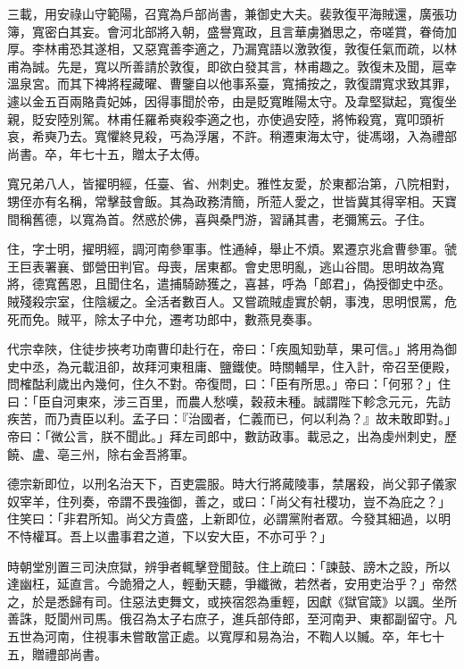 \begin{pinyinscope}
 三載，用安祿山守範陽，召寬為戶部尚書，兼御史大夫。裴敦復平海賊還，廣張功簿，寬密白其妄。會河北部將入朝，盛譽寬政，且言華虜猶思之，帝嗟賞，眷倚加厚。李林甫恐其遂相，又惡寬善李適之，乃漏寬語以激敦復，敦復任氣而疏，以林甫為誠。先是，寬以所善請於敦復，即欲白發其言，林甫趣之。敦復未及聞，扈幸溫泉宮。而其下裨將程藏曜、曹鑒自以他事系臺，寬捕按之，敦復謂寬求致其罪，遽以金五百兩賂貴妃姊，因得事聞於帝，由是貶寬睢陽太守。及韋堅獄起，寬復坐親，貶安陸別駕。林甫任羅希奭殺李適之也，亦使過安陸，將怖殺寬，寬叩頭祈哀，希奭乃去。寬懼終見殺，丐為浮屠，不許。稍遷東海太守，徙馮翊，入為禮部尚書。卒，年七十五，贈太子太傅。



 寬兄弟八人，皆擢明經，任臺、省、州刺史。雅性友愛，於東都治第，八院相對，甥侄亦有名稱，常擊鼓會飯。其為政務清簡，所蒞人愛之，世皆冀其得宰相。天寶間稱舊德，以寬為首。然惑於佛，喜與桑門游，習誦其書，老彌篤云。子住。



 住，字士明，擢明經，調河南參軍事。性通綽，舉止不煩。累遷京兆倉曹參軍。虢王巨表署襄、鄧營田判官。母喪，居東都。會史思明亂，逃山谷間。思明故為寬將，德寬舊恩，且聞住名，遣捕騎跡獲之，喜甚，呼為「郎君」，偽授御史中丞。賊殘殺宗室，住陰緩之。全活者數百人。又嘗疏賊虛實於朝，事洩，思明恨罵，危死而免。賊平，除太子中允，遷考功郎中，數燕見奏事。



 代宗幸陜，住徒步挾考功南曹印赴行在，帝曰：「疾風知勁草，果可信。」將用為御史中丞，為元載沮卻，故拜河東租庸、鹽鐵使。時關輔旱，住入計，帝召至便殿，問榷酤利歲出內幾何，住久不對。帝復問，曰：「臣有所思。」帝曰：「何邪？」住曰：「臣自河東來，涉三百里，而農人愁嘆，穀菽未種。誠謂陛下軫念元元，先訪疾苦，而乃責臣以利。孟子曰：『治國者，仁義而已，何以利為？』故未敢即對。」帝曰：「微公言，朕不聞此。」拜左司郎中，數訪政事。載忌之，出為虔州刺史，歷饒、盧、亳三州，除右金吾將軍。



 德宗新即位，以刑名治天下，百吏震服。時大行將蕆陵事，禁屠殺，尚父郭子儀家奴宰羊，住列奏，帝謂不畏強御，善之，或曰：「尚父有社稷功，豈不為庇之？」住笑曰：「非君所知。尚父方貴盛，上新即位，必謂黨附者眾。今發其細過，以明不恃權耳。吾上以盡事君之道，下以安大臣，不亦可乎？」



 時朝堂別置三司決庶獄，辨爭者輒擊登聞鼓。住上疏曰：「諫鼓、謗木之設，所以達幽枉，延直言。今詭猾之人，輕動天聽，爭纖微，若然者，安用吏治乎？」帝然之，於是悉歸有司。住惡法吏舞文，或挾宿怨為重輕，因獻《獄官箴》以諷。坐所善誅，貶閬州司馬。俄召為太子右庶子，進兵部侍郎，至河南尹、東都副留守。凡五世為河南，住視事未嘗敢當正處。以寬厚和易為治，不鞫人以贓。卒，年七十五，贈禮部尚書。




\end{pinyinscope}
